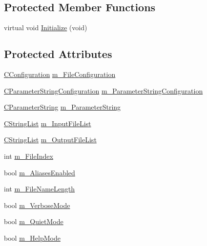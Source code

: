\subsection*{Protected Member Functions}
\begin{DoxyCompactItemize}
\item 
virtual void \hyperlink{classCGenericProcessingMachine_aa1b7cd72fef2ed2d89494cba6fd7fb71}{Initialize} (void)
\end{DoxyCompactItemize}
\subsection*{Protected Attributes}
\begin{DoxyCompactItemize}
\item 
\hyperlink{classCConfiguration}{C\-Configuration} \hyperlink{classCGenericProcessingMachine_aec120317f954ed9cd4194de815648fce}{m\-\_\-\-File\-Configuration}
\item 
\hyperlink{classCParameterStringConfiguration}{C\-Parameter\-String\-Configuration} \hyperlink{classCGenericProcessingMachine_a1f8069a91ee5ee1f418400ad1c902bba}{m\-\_\-\-Parameter\-String\-Configuration}
\item 
\hyperlink{classCParameterString}{C\-Parameter\-String} \hyperlink{classCGenericProcessingMachine_a567850641ce85513bfb28527986805e8}{m\-\_\-\-Parameter\-String}
\item 
\hyperlink{classCStringList}{C\-String\-List} \hyperlink{classCGenericProcessingMachine_a690c963f0c095ac81be430d688595c73}{m\-\_\-\-Input\-File\-List}
\item 
\hyperlink{classCStringList}{C\-String\-List} \hyperlink{classCGenericProcessingMachine_ac81ef6205c02d2d3c91f351f72ce701f}{m\-\_\-\-Output\-File\-List}
\item 
int \hyperlink{classCGenericProcessingMachine_a40b137418bef4dd847d4769ec83a9502}{m\-\_\-\-File\-Index}
\item 
bool \hyperlink{classCGenericProcessingMachine_a76422740416ac078b9999d9d6516739a}{m\-\_\-\-Aliases\-Enabled}
\item 
int \hyperlink{classCGenericProcessingMachine_a8ebb6c2d1f889af806135a862fa27831}{m\-\_\-\-File\-Name\-Length}
\item 
bool \hyperlink{classCGenericProcessingMachine_a81a35f50e9afa57d1d915bccc3276b1b}{m\-\_\-\-Verbose\-Mode}
\item 
bool \hyperlink{classCGenericProcessingMachine_aa4f21388a42eec363818933f10b587c1}{m\-\_\-\-Quiet\-Mode}
\item 
bool \hyperlink{classCGenericProcessingMachine_a1563fdca94661ae2e99a58516f795b88}{m\-\_\-\-Help\-Mode}
\end{DoxyCompactItemize}


